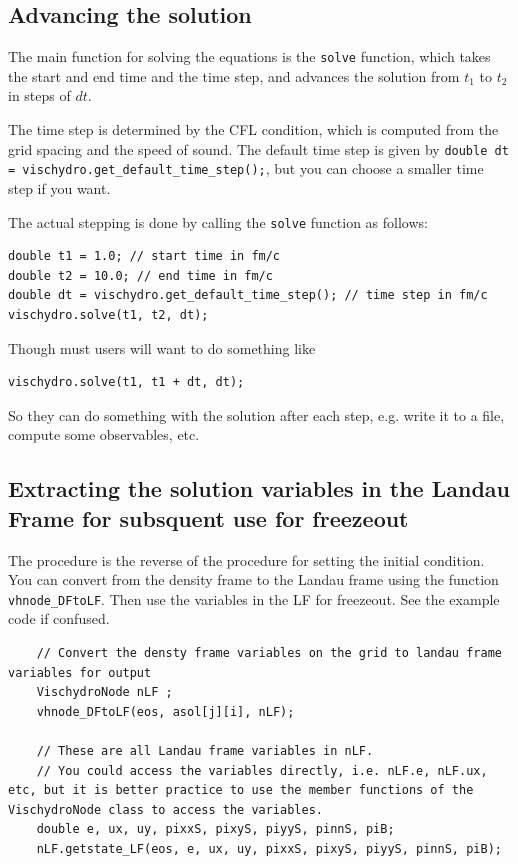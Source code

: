 \documentclass[12pt]{article}
\begin{document}
\subsection{Advancing the solution}
The main function for solving the equations is the {\tt solve} function, which takes the start and end time and the time step, and advances the solution from $t_1$ to $t_2$ in steps of $dt$.

The time step is determined by the CFL condition, which is computed from the grid spacing and the speed of sound.  The default time step is given by \texttt{double dt = vischydro.get_default_time_step();}, but you can choose a smaller time step if you want.

The actual stepping is done by calling the {\tt solve} function as follows:
\begin{verbatim}
double t1 = 1.0; // start time in fm/c
double t2 = 10.0; // end time in fm/c
double dt = vischydro.get_default_time_step(); // time step in fm/c
vischydro.solve(t1, t2, dt);
\end{verbatim}
Though must users will want to do something like 
\begin{verbatim}
vischydro.solve(t1, t1 + dt, dt);
\end{verbatim}
So they can do something with the solution after each step, e.g. write it to a file, compute some observables, etc.

\subsection{Extracting the solution variables in the Landau Frame for subsquent use for freezeout}

The procedure is the reverse of the procedure for setting the initial condition.  You can convert from the density frame to the Landau frame using the function \texttt{vhnode_DFtoLF}.  Then use the variables in the LF for freezeout. See the example code if confused.
\begin{verbatim}
    // Convert the densty frame variables on the grid to landau frame variables for output
    VischydroNode nLF ; 
    vhnode_DFtoLF(eos, asol[j][i], nLF);

    // These are all Landau frame variables in nLF. 
    // You could access the variables directly, i.e. nLF.e, nLF.ux, etc, but it is better practice to use the member functions of the VischydroNode class to access the variables.
    double e, ux, uy, pixxS, pixyS, piyyS, pinnS, piB;
    nLF.getstate_LF(eos, e, ux, uy, pixxS, pixyS, piyyS, pinnS, piB);
\end{verbatim}
\end{document}
